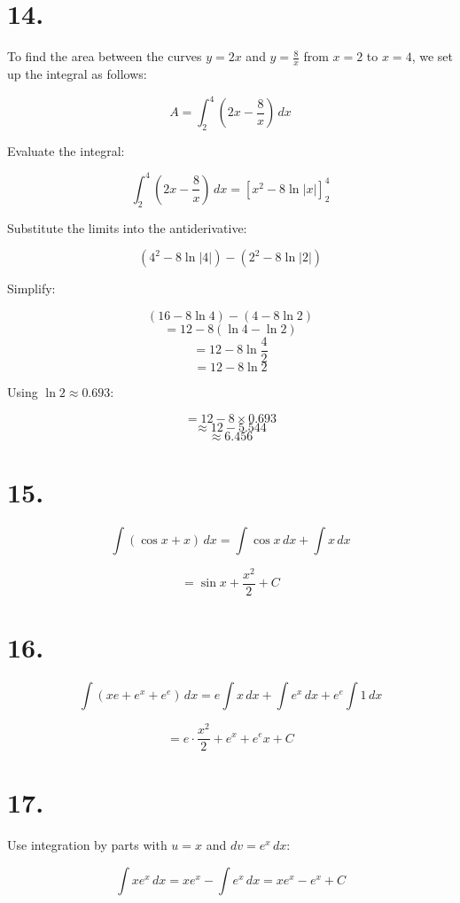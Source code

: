 \documentclass{article}
\begin{document}
\section*{14.}

To find the area between the curves \( y = 2x \) and \( y = \frac{8}{x} \) from \( x = 2 \) to \( x = 4 \), we set up the integral as follows:

\[
A = \int_{2}^{4} \left(2x - \frac{8}{x}\right) \, dx
\]

Evaluate the integral:

\[
\int_{2}^{4} \left(2x - \frac{8}{x}\right) \, dx = \left[x^2 - 8 \ln|x|\right]_{2}^{4}
\]

Substitute the limits into the antiderivative:

\[
\left(4^2 - 8 \ln|4|\right) - \left(2^2 - 8 \ln|2|\right)
\]

Simplify:

\[
\left(16 - 8 \ln 4\right) - \left(4 - 8 \ln 2\right)
\]
\[
= 12 - 8 \left(\ln 4 - \ln 2\right)
\]
\[
= 12 - 8 \ln \frac{4}{2}
\]
\[
= 12 - 8 \ln 2
\]

Using \(\ln 2 \approx 0.693\):

\[
= 12 - 8 \times 0.693
\]
\[
\approx 12 - 5.544
\]
\[
\approx 6.456
\]


\section*{15.}

    \[
\int (\cos x + x) \, dx = \int \cos x \, dx + \int x \, dx
\]

\[
= \sin x + \frac{x^2}{2} + C
\]

\section*{16.}

\[
\int \left( x e + e^x + e^e \right) \, dx = e \int x \, dx + \int e^x \, dx + e^e \int 1 \, dx
\]

\[
= e \cdot \frac{x^2}{2} + e^x + e^e x + C
\]

\section*{17.}

Use integration by parts with \( u = x \) and \( dv = e^x \, dx \):

\[
\int x e^x \, dx = x e^x - \int e^x \, dx = x e^x - e^x + C
\]
\end{document}
